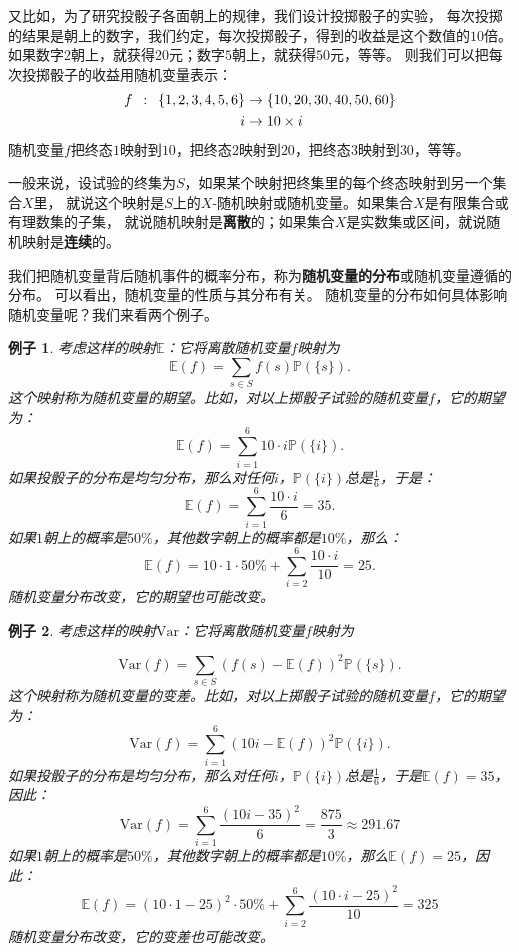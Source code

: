 \documentclass[12pt,UTF8]{ctexbook}
\newtheorem{ex}{例子}[section]
\begin{document}
又比如，为了研究投骰子各面朝上的规律，我们设计投掷骰子的实验，
每次投掷的结果是朝上的数字，我们约定，每次投掷骰子，得到的收益是这个数值的$10$倍。
如果数字$2$朝上，就获得$20$元；数字$5$朝上，就获得$50$元，等等。
则我们可以把每次投掷骰子的收益用随机变量表示：
\begin{align}
f \,\,\, : \,\,\, \{1,2,3,4,5,6\} &\rightarrow \{10,20,30,40,50,60\} \notag \\
 i &\rightarrow 10\times i \notag 
\end{align}
随机变量$f$把终态$1$映射到$10$，把终态$2$映射到$20$，把终态$3$映射到$30$，等等。

一般来说，设试验的终集为$S$，如果某个映射把终集里的每个终态映射到另一个集合$X$里，
就说这个映射是$S$上的$X$-随机映射或随机变量。如果集合$X$是有限集合或有理数集的子集，
就说随机映射是\textbf{离散}的；如果集合$X$是实数集或区间，就说随机映射是\textbf{连续}的。

我们把随机变量背后随机事件的概率分布，称为\textbf{随机变量的分布}或随机变量遵循的分布。
可以看出，随机变量的性质与其分布有关。
随机变量的分布如何具体影响随机变量呢？我们来看两个例子。
\begin{ex}
    考虑这样的映射$\mathbb{E}$：它将离散随机变量$f$映射为
    $$ \mathbb{E}(f) = \sum_{s\in S} f(s) \mathbb{P}(\{s\}).$$
    这个映射称为随机变量的期望。比如，对以上掷骰子试验的随机变量$f$，它的期望为：
    $$ \mathbb{E}(f) = \sum_{i=1}^6 10\cdot i \mathbb{P}(\{i\}).$$
    如果投骰子的分布是均匀分布，那么对任何$i$​，$\mathbb{P}(\{i\})$​总是$\frac{1}{6}$​，于是：
    $$ \mathbb{E}(f) = \sum_{i=1}^6 \frac{10\cdot i}{6} = 35. $$
    如果$1$朝上的概率是$50\%$，其他数字朝上的概率都是$10\%$​，那么：
    $$ \mathbb{E}(f) = 10\cdot 1\cdot 50\% + \sum_{i=2}^6 \frac{10\cdot i}{10} = 25. $$
    随机变量分布改变，它的期望也可能改变。
\end{ex}
\begin{ex}
    考虑这样的映射$\mathrm{Var}$：它将离散随机变量$f$映射为

    $$ \mathrm{Var}(f) = \sum_{s\in S} \left(f(s) - \mathbb{E}(f)\right)^2 \mathbb{P}(\{s\}).$$
    这个映射称为随机变量的变差。比如，对以上掷骰子试验的随机变量$f$，它的期望为：
    $$ \mathrm{Var}(f) = \sum_{i=1}^6 \left(10i - \mathbb{E}(f)\right)^2 \mathbb{P}(\{i\}).$$
    如果投骰子的分布是均匀分布，那么对任何$i$，$\mathbb{P}(\{i\})$总是$\frac{1}{6}$，于是$\mathbb{E}(f) = 35$，因此：
    $$\mathrm{Var}(f) = \sum_{i=1}^6 \frac{\left(10i - 35\right)^2}{6} = \frac{875}{3} \approx 291.67$$    
    如果$1$朝上的概率是$50\%$，其他数字朝上的概率都是$10\%$，那么$\mathbb{E}(f) = 25$，因此：    
    $$ \mathbb{E}(f) = (10\cdot 1 - 25)^2\cdot 50\% + \sum_{i=2}^6 \frac{(10\cdot i - 25)^2}{10} = 325 $$
    随机变量分布改变，它的变差也可能改变。
\end{ex}
\end{document}
